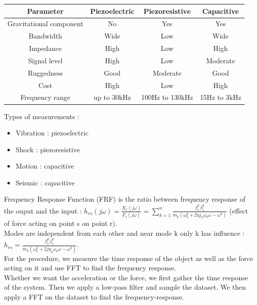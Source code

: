 \documentclass[../main.tex]{subfiles}
\begin{document}
\begin{table}[hbt!]
    \centering
    \begin{tabular}{c|c|c|c}
        Parameter & Piezoelectric & Piezoresistive & Capacitive \\ \hline
        Gravitational component & No & Yes & Yes\\ \hline
        Bandwidth & Wide & Low & Wide\\ \hline
        Impedance & High & Low & High \\ \hline
        Signal level & High & Low & Moderate\\ \hline
        Ruggedness & Good & Moderate & Good\\ \hline
        Cost & High & Low & High\\ \hline
        Frequency range & up to 30kHz & 100Hz to 130kHz & 15Hz to 3kHz\\ \hline
    \end{tabular}
\end{table}

Types of measurements : \begin{itemize}
    \item Vibration : piezoelectric\\
    \item Shock  : piezoresistive\\
    \item Motion : capacitive\\
    \item Seismic : capacitive\\
\end{itemize}

Frequency Response Function (FRF) is the ratio between frequency response of the ouput and the input : $h_{rs} (j\omega) = \frac{X_r (j\omega)}{F_s(j\omega)} = \sum_{k=1}^n \frac{\beta_r^k \beta_s^k}{m_k (\omega_k^2 + 2\eta j_k \omega_k \omega - \omega^2)}$ (effect of force acting on point s on point r).\\

Modes are independent from each other and near mode k only k has influence : $h_{rs} = \frac{\beta_r^k \beta_s^k}{m_k(\omega_k^2 + 2j\eta_k \omega_k \omega - \omega^2)}$.\\

For the procedure, we measure the time response of the object as well as the force acting on it and use FFT to find the frequency response.\\

Whether we want the acceleration or the force, we first gather the time response of the system. Then we apply a low-pass filter and sample the dataset. We then apply a FFT on the dataset to find the frequency-response.\\
\end{document}
